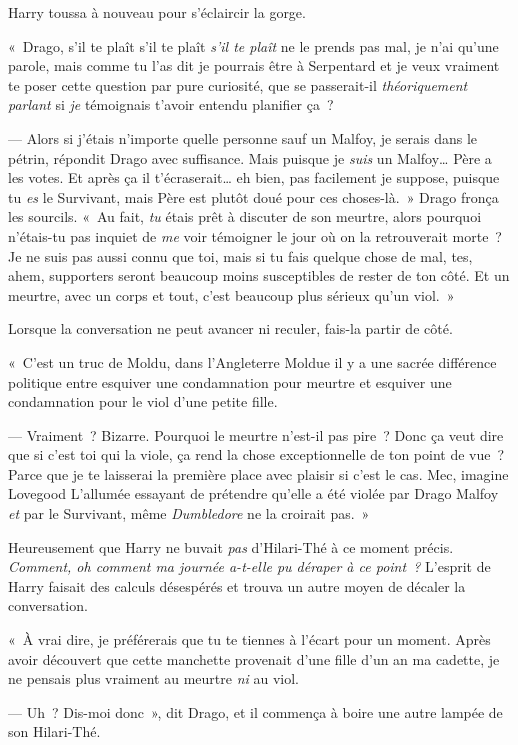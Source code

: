 Harry toussa à nouveau pour s'éclaircir la gorge.

«~Drago, s'il te plaît s'il te plaît \emph{s'il te plaît} ne le prends pas mal, je n'ai qu'une parole, mais comme tu l'as dit je pourrais être à Serpentard et je veux vraiment te poser cette question par pure curiosité, que se passerait-il \emph{théoriquement parlant} si \emph{je} témoignais t'avoir entendu planifier ça~?

--- Alors si j'étais n'importe quelle personne sauf un Malfoy, je serais dans le pétrin, répondit Drago avec suffisance. Mais puisque je \emph{suis} un Malfoy… Père a les votes. Et après ça il t'écraserait… eh bien, pas facilement je suppose, puisque tu \emph{es} le Survivant, mais Père est plutôt doué pour ces choses-là.~» Drago fronça les sourcils. «~Au fait, \emph{tu} étais prêt à discuter de son meurtre, alors pourquoi n'étais-tu pas inquiet de \emph{me} voir témoigner le jour où on la retrouverait morte~? Je ne suis pas aussi connu que toi, mais si tu fais quelque chose de mal, tes, ahem, supporters seront beaucoup moins susceptibles de rester de ton côté. Et un meurtre, avec un corps et tout, c'est beaucoup plus sérieux qu'un viol.~»

Lorsque la conversation ne peut avancer ni reculer, fais-la partir de côté.

«~C'est un truc de Moldu, dans l'Angleterre Moldue il y a une sacrée différence politique entre esquiver une condamnation pour meurtre et esquiver une condamnation pour le viol d'une petite fille.

--- Vraiment~? Bizarre. Pourquoi le meurtre n'est-il pas pire~? Donc ça veut dire que si c'est toi qui la viole, ça rend la chose exceptionnelle de ton point de vue~? Parce que je te laisserai la première place avec plaisir si c'est le cas. Mec, imagine Lovegood L'allumée essayant de prétendre qu'elle a été violée par Drago Malfoy \emph{et} par le Survivant, même \emph{Dumbledore} ne la croirait pas.~»

Heureusement que Harry ne buvait \emph{pas} d'Hilari-Thé à ce moment précis. \emph{Comment, oh comment ma journée a-t-elle pu déraper à ce point~?} L'esprit de Harry faisait des calculs désespérés et trouva un autre moyen de décaler la conversation.

«~À vrai dire, je préférerais que tu te tiennes à l'écart pour un moment. Après avoir découvert que cette manchette provenait d'une fille d'un an ma cadette, je ne pensais plus vraiment au meurtre \emph{ni} au viol.

--- Uh~? Dis-moi donc~», dit Drago, et il commença à boire une autre lampée de son Hilari-Thé.

